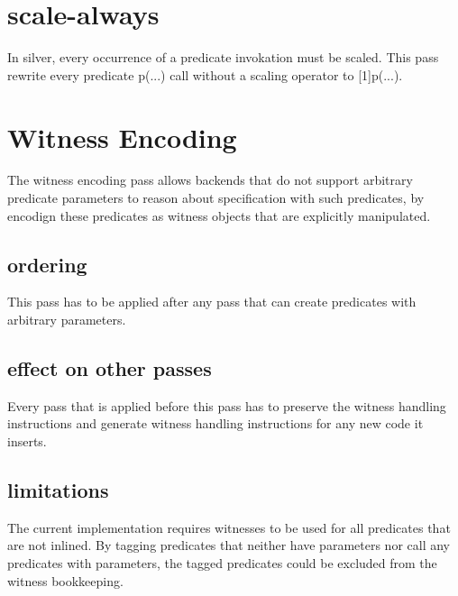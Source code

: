 
\section{scale-always}

In silver, every occurrence of a predicate invokation must be scaled.
This pass rewrite every predicate p(...) call without a scaling operator
to [1]p(...).


\section{Witness Encoding}

The witness encoding pass allows backends that do not support arbitrary
predicate parameters to reason about specification with such predicates,
by encodign these predicates as witness objects that are explicitly
manipulated.

\subsection{ordering}

This pass has to be applied after any pass that can create predicates
with arbitrary parameters.


\subsection{effect on other passes}

Every pass that is applied before this pass has to preserve the
witness handling instructions and generate witness handling instructions
for any new code it inserts.


\subsection{limitations}

The current implementation requires witnesses to be used for all predicates that
are not inlined. By tagging predicates that neither have parameters nor call
any predicates with parameters, the tagged predicates could be excluded
from the witness bookkeeping.

